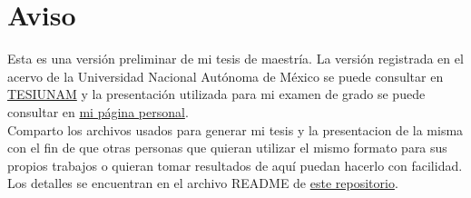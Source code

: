 \documentclass[tesis]{subfiles}
\begin{document}
\chapter*{Aviso}\label{Chap: Aviso}

Esta es una versión preliminar de mi tesis de maestría. La versión registrada en el acervo de la Universidad Nacional Autónoma de México se puede consultar en \href{https://tesiunam.dgb.unam.mx:443/F/6X9UDBS75XVGLM4VLKPIQ5AMUMQLATGMG2LH1T6J58PK24JPQK-05503?func=service&doc_library=TES01&doc_number=000831398&line_number=0001&func_code=WEB-FULL&service_type=MEDIA%22}{TESIUNAM} y la presentación utilizada para mi examen de grado se puede consultar en \href{http://dabnciencias.github.io/Examen_profesional}{mi página personal}. \\

    Comparto los archivos usados para generar mi tesis y la presentacion de la misma con el fin de que otras personas que quieran utilizar el mismo formato para sus propios trabajos o quieran tomar resultados de aquí puedan hacerlo con facilidad. Los detalles se encuentran en el archivo README de \href{https://github.com/dabnciencias/Tesis/}{este repositorio}.
\end{document}
